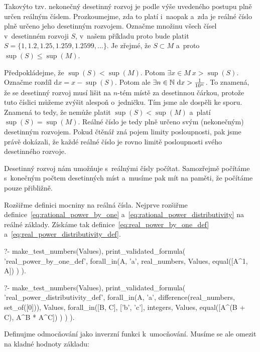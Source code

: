 Takovýto tzv. nekonečný desetinný rozvoj je podle výše uvedeného postupu plně určen reálným číslem. Prozkoumejme, zda to platí i~naopak a~zda je reálné číslo plně určeno jeho desetinným rozvojem. Označme množinu všech čísel v~desetinném rozvoji \(S\), v~našem příkladu proto bude platit \(S = \{1, 1.2, 1.25, 1.259, 1.2599, ...\}\). Je zřejmé, že \(S \subset M\) a~proto \(\sup(S) \leq \sup(M)\).

Předpokládejme, že \(\sup(S) < \sup(M)\). Potom \(\exists x \in M \ x > \sup(S)\). Označme rozdíl \(\mathrm{d}x = x - \sup(S)\). Potom ale \(\exists n \in \naturalnumbers \ \mathrm{d}x > \frac{1}{10^n}\). To znamená, že se desetinný rozvoj musí lišit na \(n\)-tém místě za desetinnou čárkou, protože tuto číslici můžeme zvýšit alespoň o~jedničku. Tím jsme ale dospěli ke sporu. Znamená to tedy, že nemůže platit \(\sup(S) < \sup(M)\) a~platí \(\sup(S) = \sup(M)\). Reálné číslo je tedy plně určeno svým (nekonečným) desetinným rozvojem. Pokud čtěnář zná pojem limity posloupnosti, pak jsme právě dokázali, že každé reálné číslo je rovno limitě posloupnosti svého desetinného rozvoje. 

Desetinný rozvoj nám umožňuje s~reálnými čísly počítat. Samozřejmě počítáme s~konečným počtem desetinných míst a~musíme pak mít na paměti, že počítáme pouze přibližně.

Rozšiřme definici mocniny na reálná čísla. Nejprve rozšiřme definice~\eqref{eq:rational_power_by_one} a~\eqref{eq:rational_power_distributivity} na reálné základy. Získáme tak definice~\eqref{eq:real_power_by_one_def} a~\eqref{eq:real_power_distributivity_def}.

\begin{fact}
\begin{prolog}
?-	make_test_numbers(Values),
	print_validated_formula(
		'real_power_by_one_def',
		forall_in(A, 'a', real_numbers, Values,
			equal([A^1, A])
		)
	).				
\end{prolog}
\begin{prolog}
?-	make_test_numbers(Values),
	print_validated_formula(
		'real_power_distributivity_def',
		forall_in(A, 'a', difference(real_numbers, set_of([0])), Values,
			forall_in([B, C], ['b', 'c'], integers, Values,
				equal([A^(B + C), A^B * A^C])
			)
		)
	).				
\end{prolog}
\end{fact}

Definujme odmocňování jako inverzní funkci k~umocňování. Musíme se ale omezit na kladné hodnoty základu:

